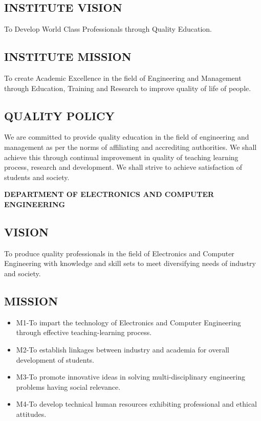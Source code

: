 \documentclass[12pt]{report}	%
\begin{document}
\subsection*           {INSTITUTE VISION}
To Develop World Class Professionals through Quality Education.
\subsection*           {INSTITUTE MISSION}
To create Academic Excellence in the field of Engineering and Management through Education, Training and Research to improve quality of life of people.
\subsection*           {QUALITY POLICY}
We are committed to provide quality education in the field of 
engineering and management as per the norms of affiliating and accrediting authorities.
We shall achieve this through continual improvement in quality of teaching learning process, research and development. We shall strive to achieve satisfaction of students and society.
%
\newpage
\newenvironment{DEPARTMENT OF  ELECTRONICS AND COMPUTER ENGINEERING}
\thispagestyle{empty}
\begin{center}
\vspace*{50pt}
\textbf{DEPARTMENT OF  ELECTRONICS AND COMPUTER ENGINEERING}\\
\end{center}
\thispagestyle{empty}
\subsection*{VISION}
To produce quality professionals in the field of Electronics and Computer Engineering with knowledge and skill sets to meet diversifying needs of industry and society.
\subsection*{MISSION}
\begin{itemize}
    \item M1-To impart the technology of Electronics and Computer Engineering through effective teaching-learning process. 
    \item M2-To establish linkages between industry and academia for overall development of students.  
    \item M3-To promote innovative ideas in solving multi-disciplinary engineering problems having social relevance.
    \item M4-To develop technical human resources exhibiting professional and ethical attitudes.
\end{itemize}
\end{document}
